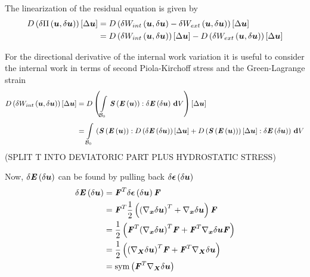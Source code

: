 The linearization of the residual equation is given by 
\begin{equation}
  \begin{split}
       D\left( \delta \Pi\left( \boldsymbol{u},\delta\boldsymbol{u} \right)  \right) \left[ \Delta\boldsymbol{u} \right]  &=
       D\left( \delta W_{int}\left( \boldsymbol{u},\delta\boldsymbol{u} \right) -
      \delta W_{ext}\left( \boldsymbol{u},\delta\boldsymbol{u} \right)  \right) \left[ \Delta\boldsymbol{u} \right]  \\
    &=   D\left( \delta W_{int}\left( \boldsymbol{u},\delta\boldsymbol{u} \right)  \right) \left[ \Delta\boldsymbol{u} \right]  -
       D\left( \delta W_{ext}\left( \boldsymbol{u},\delta\boldsymbol{u} \right)  \right) \left[ \Delta\boldsymbol{u} \right]  
  \end{split}
\end{equation}

For the directional derivative of the internal work variation it is useful to consider
the internal work in terms of second Piola-Kirchoff stress and the
Green-Lagrange strain \ie
\begin{equation}
  \begin{split}
       D\left( \delta W_{int}\left( \boldsymbol{u},\delta\boldsymbol{u} \right)  \right) \left[ \Delta\boldsymbol{u} \right]  &=
       D\left(   \displaystyle\int\limits_{ \mathcal{B} _{0}}^{} \, \boldsymbol{\mathit{S}}\left( 
             \boldsymbol{\mathit{E}}\left( \boldsymbol{u} \right)  \right) :\delta \boldsymbol{\mathit{E}}\left( \delta\boldsymbol{u} \right) \, \boldsymbol{\mathrm{d}}  V  \right) \left[ \Delta\boldsymbol{u} \right]  \\
    &=  \displaystyle\int\limits_{ \mathcal{B} _{0}}^{} \,\left(  \boldsymbol{\mathit{S}}\left( 
           \boldsymbol{\mathit{E}}\left( \boldsymbol{u} \right)  \right) :   D\left( \delta \boldsymbol{\mathit{E}}\left( \delta\boldsymbol{u} \right)  \right) \left[ \Delta\boldsymbol{u} \right]  +
         D\left(  \boldsymbol{\mathit{S}}\left( 
             \boldsymbol{\mathit{E}}\left( \boldsymbol{u} \right)  \right)  \right) \left[ \Delta\boldsymbol{u} \right]  :\delta \boldsymbol{\mathit{E}}\left( \delta\boldsymbol{u} \right)  \right)\, \boldsymbol{\mathrm{d}}  V 
  \end{split}
\end{equation}
(SPLIT T INTO DEVIATORIC PART PLUS HYDROSTATIC STRESS)

Now, $\delta \boldsymbol{\mathit{E}}\left( \delta\boldsymbol{u} \right) $ can be found by pulling
back $\delta \boldsymbol{\mathit{\epsilon}}\left( \delta\boldsymbol{u} \right) $ \ie
\begin{equation}
  \begin{split}
    \delta\fnof{\tensortwo{E}}{\delta\vectr{u}}&=
    \transpose{\tensortwo{F}}\delta\fnof{\tensortwo{\epsilon}}{\delta\vectr{u}}\tensortwo{F}\\
    &=\transpose{\tensortwo{F}}\frac{1}{2}\pbrac{\transpose{\pbrac{\gradient{\vectr{x}}{\delta\vectr{u}}}}
      +\gradient{\vectr{x}}{\delta\vectr{u}}}\tensortwo{F}\\
    &=\frac{1}{2}\pbrac{\transpose{\tensortwo{F}}\transpose{\pbrac{\gradient{\vectr{x}}{\delta\vectr{u}}}}\tensortwo{F}+
      \transpose{\tensortwo{F}}\gradient{\vectr{x}}{\delta\vectr{u}}\tensortwo{F}}\\
    &=\frac{1}{2}\pbrac{\transpose{\pbrac{\gradient{\vectr{X}}{\delta\vectr{u}}}}\tensortwo{F}+
      \transpose{\tensortwo{F}}\gradient{\vectr{X}}{\delta\vectr{u}}} \\
    &= \symop\pbrac{\transpose{\tensortwo{F}}\gradient{\vectr{X}}{\delta\vectr{u}}}
  \end{split}
\end{equation}


